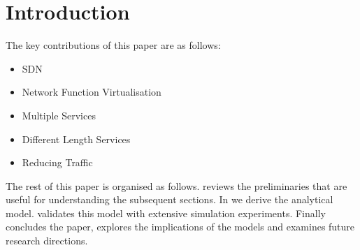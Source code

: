 
\section{Introduction}
\label{sec:introduction}


The key contributions of this paper are as follows:

\begin{itemize}

\item SDN
\item Network Function Virtualisation
\item Multiple Services
\item Different Length Services
\item Reducing Traffic

\end{itemize}


The rest of this paper is organised as follows.  reviews the preliminaries that are useful for understanding the subsequent sections. In  we derive the analytical model.  validates this model with extensive simulation experiments. Finally  concludes the paper, explores the implications of the models and examines future research directions.